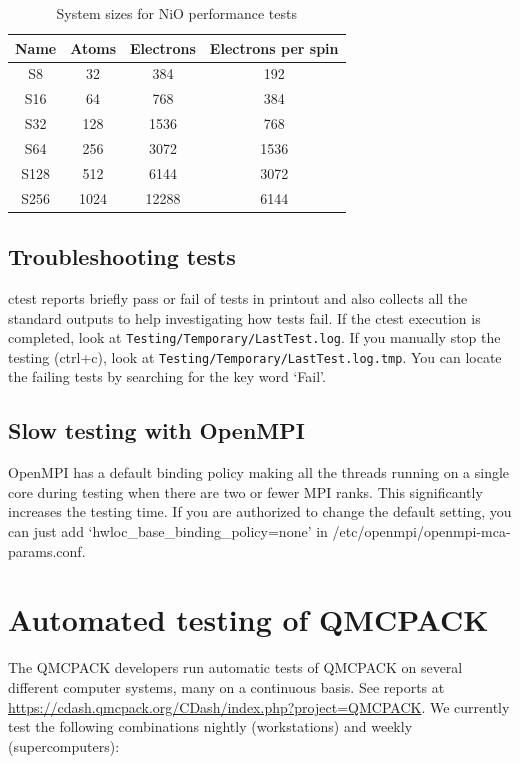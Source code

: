 \begin{table}[h]
\begin{center}
\begin{tabular}{|c|c|c|c|}
\hline
\bfseries Name&  \bfseries Atoms& \bfseries Electrons&  \bfseries Electrons per spin \\
\hline
 S8  &  32  &    384  &   192 \\
S16 &   64  &    768  &  384 \\
S32  & 128  &   1536 &           768 \\
S64  & 256  &   3072 &     1536 \\
S128  & 512  &   6144 &      3072 \\
S256  & 1024 & 12288 &  6144 \\
\hline
\end{tabular}
  \caption{System sizes for NiO performance tests}
  \label{tab:niotests}
\end{center}
\end{table}

\subsection{Troubleshooting tests}
ctest reports briefly pass or fail of tests in printout and also collects all the standard outputs to help investigating how tests fail.
If the ctest execution is completed, look at \texttt{Testing/Temporary/LastTest.log}.
If you manually stop the testing (ctrl+c), look at \texttt{Testing/Temporary/LastTest.log.tmp}.
You can locate the failing tests by searching for the key word `Fail'.

\subsection{Slow testing with OpenMPI}
OpenMPI has a default binding policy making all the threads running on a single core during testing when there are two or fewer MPI ranks.
This significantly increases the testing time. If you are authorized to change the default setting, you can just add `hwloc\_base\_binding\_policy=none' in /etc/openmpi/openmpi-mca-params.conf.

\section{Automated testing of QMCPACK}

The QMCPACK developers run automatic tests of QMCPACK on several
different computer systems,  many on a continuous basis. See reports at
\url{https://cdash.qmcpack.org/CDash/index.php?project=QMCPACK}.
We currently test
the following combinations nightly (workstations) and weekly (supercomputers):

